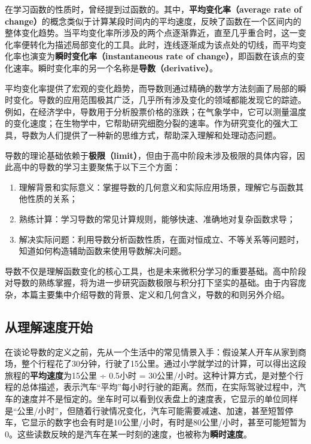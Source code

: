 
\begin{issues}
\issueDraft
\end{issues}

在学习函数的性质时，曾经提到过函数的。其中，\textbf{平均变化率（average rate of change）}的概念类似于计算某段时间内的平均速度，反映了函数在一个区间内的整体变化趋势。当平均变化率所涉及的两个点逐渐靠近，直至几乎重合时，这一变化率便转化为描述局部变化的工具。此时，连线逐渐成为该点处的切线，而平均变化率也演变为\textbf{瞬时变化率（instantaneous rate of change）}，即函数在该点的变化速率。瞬时变化率的另一个名称是\textbf{导数（derivative）}。

平均变化率提供了宏观的变化趋势，而导数则通过精确的数学方法刻画了局部的瞬时变化。导数的应用范围极其广泛，几乎所有涉及变化的领域都能发现它的踪迹。例如，在经济学中，导数用于分析股票价格的涨跌；在气象学中，它可以测量温度的变化速度；在生物学中，它帮助研究细胞分裂的速率。作为研究变化的强大工具，导数为人们提供了一种新的思维方式，帮助深入理解和处理动态问题。

导数的理论基础依赖于\textbf{极限（limit）}，但由于高中阶段未涉及极限的具体内容，因此高中的导数的学习主要聚焦于以下三个方面：
\begin{enumerate}
\item 理解背景和实际意义：掌握导数的几何意义和实际应用场景，理解它与函数其他性质的关系；
\item 熟练计算：学习导数的常见计算规则，能够快速、准确地对复杂函数求导；
\item 解决实际问题：利用导数分析函数性质，在面对恒成立、不等关系等问题时，知道如何构造辅助函数来使用导数解决问题。
\end{enumerate}

导数不仅是理解函数变化的核心工具，也是未来微积分学习的重要基础。高中阶段对导数的熟练掌握，将为进一步研究函数极限与积分打下坚实的基础。由于内容庞杂，本篇主要集中介绍导数的背景、定义和几何含义，导数的和则另外介绍。

\subsection{从理解速度开始}

在谈论导数的定义之前，先从一个生活中的常见情景入手：假设某人开车从家到商场，整个行程花了30分钟，行驶了15公里。通过小学就学过的计算，可以得出这段旅程的\textbf{平均速度}为15公里 ÷ 0.5小时 = 30公里/小时。这种计算方式，是对整个行程的总体描述，表示汽车“平均”每小时行驶的距离。然而，在实际驾驶过程中，汽车的速度并不是恒定的。坐车时可以看到仪表盘上的速度表，它显示的单位同样是“公里/小时”，但随着行驶情况变化，汽车可能需要减速、加速，甚至短暂停车，它显示的数字也会有时是10公里/小时，有时是80公里/小时，甚至可能短暂为0。这些读数反映的是汽车在某一时刻的速度，也被称为\textbf{瞬时速度}。


